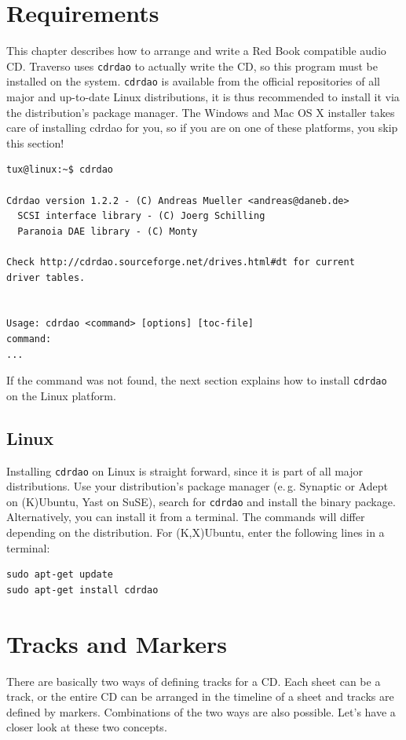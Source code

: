 \section{Requirements}
This chapter describes how to arrange and write a Red Book compatible audio CD. Traverso uses \texttt{cdrdao} to actually write the CD, so this program must be installed on the system. \texttt{cdrdao} is available from the official repositories of all  major and up-to-date Linux distributions, it is thus recommended to install it via the distribution's package manager. The Windows and Mac OS X installer takes care of installing cdrdao for you, so if you are on one of these platforms, you skip this section!

\footnotesize
\begin{verbatim}
tux@linux:~$ cdrdao

Cdrdao version 1.2.2 - (C) Andreas Mueller <andreas@daneb.de>
  SCSI interface library - (C) Joerg Schilling
  Paranoia DAE library - (C) Monty

Check http://cdrdao.sourceforge.net/drives.html#dt for current 
driver tables.


Usage: cdrdao <command> [options] [toc-file]
command:
...
\end{verbatim}
\normalsize

If the command was not found, the next section explains how to install \texttt{cdrdao} on the Linux platform.

\subsection{Linux}
Installing \texttt{cdrdao} on Linux is straight forward, since it is part of all major distributions. Use your distribution's package manager (e.\,g. Synaptic or Adept on (K)Ubuntu, Yast on SuSE), search for \texttt{cdrdao} and install the binary package. Alternatively, you can install it from a terminal. The commands will differ depending on the distribution. For (K,X)Ubuntu, enter the following lines in a terminal:

\begin{verbatim}
sudo apt-get update
sudo apt-get install cdrdao
\end{verbatim}


\section{Tracks and Markers}
There are basically two ways of defining tracks for a CD. Each sheet can be a track, or the entire CD can be arranged in the timeline of a sheet and tracks are defined by markers. Combinations of the two ways are also possible. Let's have a closer look at these two concepts.

